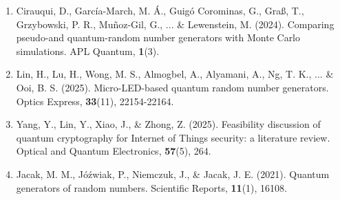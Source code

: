 \documentclass[12pt,lettersize,oneside]{book} %
\begin{document}
\begin{talk}
\medskip

\begin{enumerate}
\item[{[1]}] Cirauqui, D., Garc\'ia-March, M. \'A., Guig\'o Corominas, G., Gra{\ss}, T., Grzybowski, P. R., Mu\~noz-Gil, G., ... \& Lewenstein, M. (2024). Comparing pseudo-and quantum-random number generators with Monte Carlo simulations. APL Quantum,  \textbf{1}(3).

\item[{[2]}]  Lin, H., Lu, H., Wong, M. S., Almogbel, A., Alyamani, A., Ng, T. K., ... \& Ooi, B. S. (2025). Micro-LED-based quantum random number generators. Optics Express, \textbf{33}(11), 22154-22164.

\item[{[3]}]  Yang, Y., Lin, Y., Xiao, J., \& Zhong, Z. (2025). Feasibility discussion of quantum cryptography for Internet of Things security: a literature review. Optical and Quantum Electronics, \textbf{57}(5), 264.

\item [{[4]}]  Jacak, M. M., J\'oźwiak, P., Niemczuk, J., \& Jacak, J. E. (2021). Quantum generators of random numbers. Scientific Reports, \textbf{11}(1), 16108.
\end{enumerate}

\end{talk}
\end{document}
